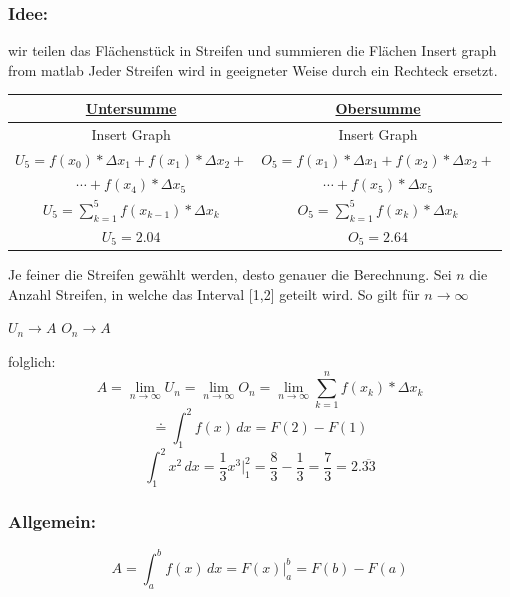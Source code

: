 \documentclass[11pt]{amsart}
\theoremstyle{remark}
\begin{document}
\subsubsection*{Idee:} wir teilen das Fl\"achenst\"uck in Streifen und summieren die Fl\"achen\newline
Insert graph from matlab\newline
Jeder Streifen wird in geeigneter Weise durch ein Rechteck ersetzt.
\begin{table}[h]
	\begin{center}
		\begin{tabular}[h]{c|c}
			\underline{Untersumme}&\underline{Obersumme}\\
			\hline
			Insert Graph & Insert Graph\\
			$U_5 = f(x_0)*\Delta x_1 +  f(x_1)*\Delta x_2 +$ & $O_5 = f(x_1)*\Delta x_1 +  f(x_2)*\Delta x_2 +$ \\
			\indent $\cdots + f(x_4)*\Delta x_5$& \indent $ \cdots + f(x_5)*\Delta x_5$\\
			$U_5 = \sum\nolimits_{k=1}^5 f(x_{k-1})*\Delta x_k$       & $O_5 = \sum\nolimits_{k=1}^5 f(x_{k})*\Delta x_k$\\
			$U_5 = 2.04$& $O_5 = 2.64$\\
		\end{tabular}
	\end{center}
\end{table}
Je feiner die Streifen gew\"ahlt werden, desto genauer die Berechnung.\newline
Sei $n$ die Anzahl Streifen, in welche das Interval [1,2] geteilt wird. So gilt f\"ur $n \to \infty$\newline
\begin{center}
	$U_n \to A$\newline
	$O_n \to A$\newline
\end{center}
folglich:
\begin{equation*}
	A = \lim_{n \to \infty} U_n = \lim_{n \to \infty} O_n = \lim_{n \to \infty} \sum_{k=1}^n f(x_k)*\Delta x_k
\end{equation*}
\begin{equation*}
	\doteq \int_{1}^2 f(x)\,dx = F(2)-F(1)
\end{equation*}
\begin{equation*}
	\int_{1}^2 x^2\,dx =  \frac 13 x^3\vert_1^2 = \frac 83 - \frac 13 = \frac 73 = 2.\overline{33}
\end{equation*}
\subsubsection*{Allgemein:}
\begin{equation*}
	A = \int_{a}^b f(x)\,dx =  F(x)\vert_a^b = F(b) - F(a)
\end{equation*}
\end{document}

